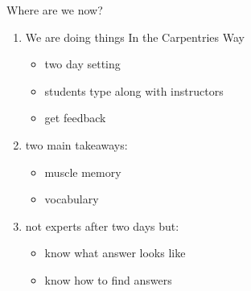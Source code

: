 \begin{frame} {Where are we now?}
	\begin{enumerate}
		\item We are doing things In the Carpentries Way
		\begin{itemize}
			\item two day setting
			\item students type along with instructors
			\item get feedback
		\end{itemize}
		\item two main takeaways:
			\begin{itemize}
				\item muscle memory 
				\item vocabulary
			\end{itemize}
		\item not experts after two days but:
			\begin{itemize}
				\item know what answer looks like
				\item know how to find answers
			\end{itemize} 
	\end{enumerate}
	
	\note[item]{}
\end{frame}